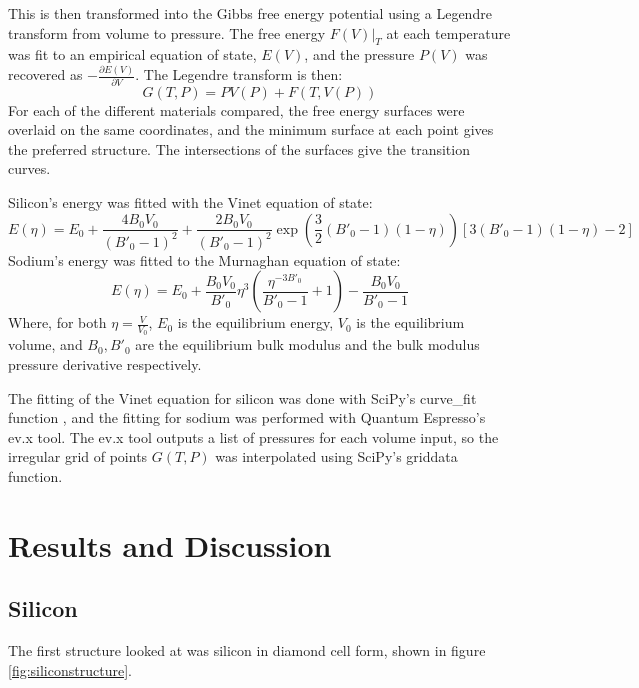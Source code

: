 \documentclass[12pt]{article}
\begin{document}
This is then transformed into the Gibbs free energy potential using a Legendre transform from volume to pressure. The free energy $F(V)|_T$ at each temperature was fit to an empirical equation of state, $E(V)$, and the pressure $P(V)$ was recovered as $-\frac{\partial E(V)}{\partial V}$. The Legendre transform is then:
\begin{equation}
	G(T, P) = PV(P) + F(T, V(P))
\end{equation}
For each of the different materials compared, the free energy surfaces were overlaid on the same coordinates, and the minimum surface at each point gives the preferred structure. The intersections of the surfaces give the transition curves.

Silicon's energy was fitted with the Vinet equation of state:
\begin{equation}\label{eq:vinet}
E(\eta) = E_0 + \frac{4B_0V_0}{(B'_0-1)^2} + \frac{2B_0V_0}{(B'_0-1)^2}\exp{\left(\frac{3}{2}(B'_0-1)(1-\eta)\right)}[3(B'_0-1)(1-\eta)-2]
\end{equation}
Sodium's energy was fitted to the Murnaghan equation of state:
\begin{equation}\label{eq:bm}
E(\eta) = E_0+\frac{B_0V_0}{B'_0}\eta^3\left( \frac{\eta^{-3B'_0}}{B'_0-1}+1\right)-\frac{B_0V_0}{B'_0-1}
\end{equation}
Where, for both $\eta=\frac{V}{V_0}$, $E_0$ is the equilibrium energy, $V_0$ is the equilibrium volume, and $B_0, B'_0$ are the equilibrium bulk modulus and the bulk modulus pressure derivative respectively.

The fitting of the Vinet equation for silicon was done with SciPy's curve\_fit function \cite{scipy}, and the fitting for sodium was performed with Quantum Espresso's ev.x tool. The ev.x tool outputs a list of pressures for each volume input, so the irregular grid of points $G(T, P)$ was interpolated using SciPy's griddata function.
\section{Results and Discussion}
\subsection{Silicon}

The first structure looked at was silicon in diamond cell form, shown in figure \ref{fig:siliconstructure}.
\end{document}

